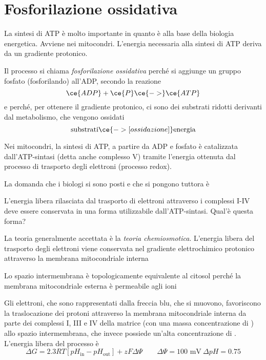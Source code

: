 \chapter{Fosforilazione ossidativa}


La sintesi di ATP è molto importante in quanto è alla base della biologia energetica. Avviene nei mitocondri. L'energia necessaria alla sintesi di ATP deriva da un gradiente protonico.

Il processo si chiama \emph{fosforilazione ossidativa} perché si aggiunge un gruppo fosfato (fosforilando) all'ADP, secondo la reazione
\[
   \ce{ADP} + \ce{P} \ce{->} \ce{ATP}
\]
e perché, per ottenere il gradiente protonico, ci sono dei substrati ridotti derivanti dal metabolismo, che vengono ossidati
\[
   \text{substrati} \ce{->[ossidazione]} \text{energia}
\]

Nei mitocondri, la sintesi di ATP, a partire da ADP e fosfato è catalizzata dall'ATP-sintasi (detta anche complesso V) tramite l'energia ottenuta dal processo di trasporto degli elettroni (processo redox).

La domanda che i biologi si sono posti e che si pongono tuttora è
\begin{quoting}
L'energia libera rilasciata dal trasporto di elettroni attraverso i complessi I-IV deve essere conservata in una forma utilizzabile dall'ATP-sintasi. Qual'è questa forma?
\end{quoting}

La teoria generalmente accettata è la \emph{teoria chemiosmotica}. L'energia libera del trasporto degli elettroni viene conservata nel gradiente elettrochimico protonico attraverso la membrana mitocondriale interna


Lo spazio intermembrana è topologicamente equivalente al citosol perché la membrana mitocondriale esterna è permeabile agli ioni 


Gli elettroni, che sono rappresentati dalla freccia blu, che si muovono, favoriscono la traslocazione dei protoni attraverso la membrana mitocondriale interna da parte dei complessi I, III e IV  della matrice (con una massa concentrazione di ) allo spazio intermembrana, che invece possiede un'alta concentrazione di .
L'energia libera del processo è
\[
   \Delta G = 2.3 RT [pH_{\text{in}} - pH_{\text{out}}] + zF \Delta \Psi \qquad \Delta \Psi = 100 \text{ mV} \: \Delta pH = 0.75
\]

